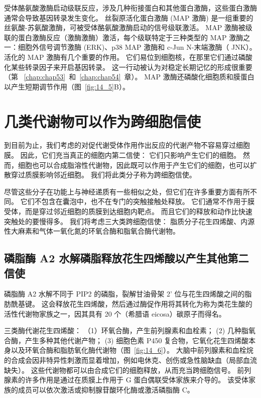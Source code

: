 受体酪氨酸激酶启动级联反应，涉及几种衔接蛋白和其他蛋白激酶，这些蛋白激酶通常会导致基因转录发生变化。 丝裂原活化蛋白激酶 (MAP 激酶) 是一组重要的丝氨酸-苏氨酸激酶，可被受体酪氨酸激酶启动的信号级联激活。
MAP 激酶被级联的蛋白激酶反应（激酶激酶）激活，每个级联特定于三种类型的 MAP 激酶之一：细胞外信号调节激酶 (ERK)、p38 MAP 激酶和 c-Jun N-末端激酶（ JNK）。
活化的 MAP 激酶有几个重要的作用。
它们易位到细胞核，在那里它们通过磷酸化某些转录因子来开启基因转录。
这一行动被认为对稳定长期记忆的形成很重要（第 ~\ref{chap:chap53}~和~\ref{chap:chap54}~章）。
MAP 激酶还磷酸化细胞质和膜蛋白以产生短期调节作用（图~\ref{fig:14_5}B）。



\section{几类代谢物可以作为跨细胞信使}

到目前为止，我们考虑的对促代谢受体作用作出反应的代谢产物不容易穿过细胞膜。
因此，它们充当真正的细胞内第二信使：
它们只影响产生它们的细胞。
然而，细胞也可以合成脂溶性代谢物，因此既可以作用于产生它们的细胞，也可以扩散穿过质膜影响邻近细胞。
我们将此类分子称为跨细胞信使。


尽管这些分子在功能上与神经递质有一些相似之处，但它们在许多重要方面有所不同。
它们不包含在囊泡中，也不在专门的突触接触处释放。
它们通常不作用于膜受体，而是穿过邻近细胞的质膜到达细胞内靶点。
而且它们的释放和动作比快速突触处的要慢得多。
我们将考虑三大类跨细胞信使：
脂质分子花生四烯酸、内源性大麻素和气体一氧化氮的环氧合酶和脂氧合酶代谢物。



\subsection{磷脂酶 A2 水解磷脂释放花生四烯酸以产生其他第二信使}

磷脂酶 A2 水解不同于 PIP2 的磷脂，裂解甘油骨架 2' 位与花生四烯酸之间的脂肪酰基键。
这会释放花生四烯酸，然后通过酶促作用将其转化为称为类花生酸的活性代谢物家族之一，因其具有 20 个（希腊语 eicosa）碳原子而得名。


三类酶代谢花生四烯酸：
（1）环氧合酶，产生前列腺素和血栓素；
(2) 几种脂氧合酶，产生多种其他代谢产物；
(3) 细胞色素 P450 复合物，它氧化花生四烯酸本身以及环氧合酶和脂肪氧化酶代谢物（图~\ref{fig:14_6}）。
大脑中前列腺素和血栓烷的合成会因非特异性刺激而显着增加，例如电休克、创伤或急性脑缺血（局部血流缺失）。
这些代谢物都可以由合成它们的细胞释放，从而充当跨细胞信号。
前列腺素的许多作用是通过在质膜上作用于 G 蛋白偶联受体家族来介导的。
该受体家族的成员可以依次激活或抑制腺苷酸环化酶或激活磷脂酶 C。


